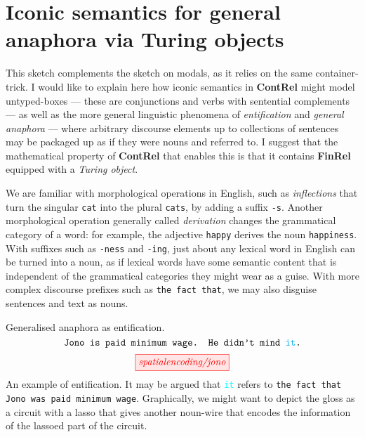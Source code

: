 \section{Iconic semantics for general anaphora via Turing objects}

This sketch complements the sketch on modals, as it relies on the same container-trick. I would like to explain here how iconic semantics in \textbf{ContRel} might model untyped-boxes --- these are conjunctions and verbs with sentential complements --- as well as the more general linguistic phenomena of \emph{entification} and \emph{general anaphora} --- where arbitrary discourse elements up to collections of sentences may be packaged up as if they were nouns and referred to. I suggest that the mathematical property of \textbf{ContRel} that enables this is that it contains \textbf{FinRel} equipped with a \emph{Turing object}.

 We are familiar with morphological operations in English, such as \emph{inflections} that turn the singular \texttt{cat} into the plural \texttt{cats}, by adding a suffix \texttt{-s}. Another morphological operation generally called \emph{derivation} changes the grammatical category of a word: for example, the adjective \texttt{happy} derives the noun \texttt{happiness}. With suffixes such as \texttt{-ness} and \texttt{-ing}, just about any lexical word in English can be turned into a noun, as if lexical words have some semantic content that is independent of the grammatical categories they might wear as a guise. With more complex discourse prefixes such as \texttt{the fact that}, we may also disguise sentences and text as nouns.

\begin{example}{Generalised anaphora as entification.}
\[\texttt{Jono is paid minimum wage. He didn't mind \textcolor{cyan}{it}.}\]
\[\tikzfig{spatialencoding/jono}\]
An example of entification. It may be argued that \textcolor{cyan}{\texttt{it}} refers to \texttt{the fact that Jono was paid minimum wage}. Graphically, we might want to depict the gloss as a circuit with a lasso that gives another noun-wire that encodes the information of the lassoed part of the circuit.
\end{example}


